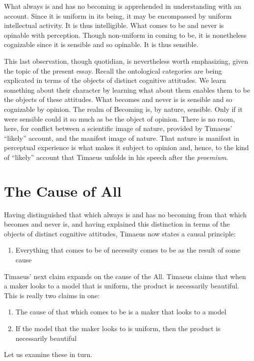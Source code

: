 What always is and has no becoming is apprehended in understanding with an account. Since it is uniform in its being, it may be encompassed by uniform intellectual activity. It is thus intelligible. What comes to be and never is opinable with perception. Though non-uniform in coming to be, it is nonetheless cognizable since it is sensible and so opinable. It is thus sensible.

This last observation, though quotidian, is nevertheless worth emphasizing, given the topic of the present essay. Recall the ontological categories are being explicated in terms of the objects of distinct cognitive attitudes. We learn something about their character by learning what about them enables them to be the objects of these attitudes. What becomes and never is is sensible and so cognizable by opinion. The realm of Becoming is, by nature, sensible. Only if it were sensible could it so much as be the object of opinion. There is no room, here, for conflict between a scientific image of nature, provided by Timaeus' ``likely'' account, and the manifest image of nature. That nature is manifest in perceptual experience is what makes it subject to opinion and, hence, to the kind of ``likely'' account that Timaeus unfolds in his speech after the \emph{proemium}.


\section{The Cause of All} %
\label{sec:the_cause_of_all}

Having distinguished that which always is and has no becoming from that which becomes and never is, and having explained this distinction in terms of the objects of distinct cognitive attitudes, Timaeus now states a causal principle:
\begin{enumerate}[(1)]
	\item Everything that comes to be of necessity comes to be as the result of some cause
\end{enumerate}
Timaeus' next claim expands on the cause of the All. Timaeus claims that when a maker looks to a model that is uniform, the product is necessarily beautiful. This is really two claims in one:
\begin{enumerate}[(1)]\addtocounter{enumi}{1}
	\item The cause of that which comes to be is a maker that looks to a model
	\item If the model that the maker looks to is uniform, then the product is necessarily beautiful
\end{enumerate}
Let us examine these in turn.

